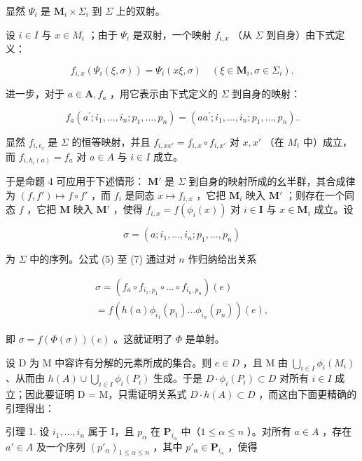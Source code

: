 显然 \(\Psi_{i}\) 是 \(\mathbf{M}_i\times \Sigma_i\) 到 \(\Sigma\) 上的双射。

设 \(i \in I\) 与 \(x \in M_i\) ；由于 \(\Psi_i\) 是双射，一个映射 \(f_{i,x}\) （从 \(\Sigma\) 到自身）由下式定义：

\[
f _ {i, x} (\Psi_ {i} (\xi , \sigma)) = \Psi_ {i} (x \xi , \sigma) \quad (\xi \in \mathbf {M} _ {i}, \sigma \in \Sigma_ {i}).\tag{6}
\]

进一步，对于 \(a \in \mathbf{A}, f_a\) ，用它表示由下式定义的 \(\Sigma\) 到自身的映射：

\[
f _ {a} (a ^ {\prime}; i _ {1}, \dots , i _ {n}; p _ {1}, \dots , p _ {n}) = (a a ^ {\prime}; i _ {1}, \dots , i _ {n}; p _ {1}, \dots , p _ {n}).\tag{7}
\]

显然 \(f_{i, e_i}\) 是 \(\Sigma\) 的恒等映射，并且 \(f_{i, xx'} = f_{i, x} \circ f_{i, x'}\) 对 \(x, x'\) （在 \(M_i\) 中）成立，而 \(f_{i, h_i(a)} = f_a\) 对 \(a \in A\) 与 \(i \in I\) 成立。

于是命题 4 可应用于下述情形： \(\mathbf{M}'\) 是 \(\Sigma\) 到自身的映射所成的幺半群，其合成律为 \((f, f') \mapsto f \circ f'\) ，而 \(f_{i}\) 是同态 \(x \mapsto f_{i,x}\) ，它把 \(\mathbf{M}_{i}\) 映入 \(\mathbf{M}'\) ；则存在一个同态 \(f\) ，它把 \(\mathbf{M}\) 映入 \(\mathbf{M}'\) ，使得 \(f_{i,x} = f(\phi_i(x))\) 对 \(i \in \mathbf{I}\) 与 \(x \in \mathbf{M}_i\) 成立。设

\[
\sigma = (a; i _ {1}, \dots , i _ {n}; p _ {1}, \dots , p _ {n})
\]

为 \(\Sigma\) 中的序列。公式 (5) 至 (7) 通过对 \(n\) 作归纳给出关系

\[
\begin{array}{l} \sigma = (f _ {a} \circ f _ {i _ {1}, p _ {1}} \circ \dots \circ f _ {i _ {n}, p _ {n}}) (e) \\ = f (h (a) \phi_ {i _ {1}} (p _ {1}) \dots \phi_ {i _ {n}} (p _ {n})) (e), \end{array}
\]

即 \(\sigma = f(\Phi(\sigma))(e)\) 。这就证明了 \(\Phi\) 是单射。


设 D 为 M 中容许有分解的元素所成的集合。则 \(e \in D\) ，且 M 由 \(\bigcup_{i \in I} \phi_i(M_i)\) 、从而由 \(h(A) \cup \bigcup_{i \in I} \phi_i(P_i)\) 生成。于是 \(D \cdot \phi_i(P_i) \subset D\) 对所有 \(i \in I\) 成立；因此要证明 D = M，只需证明关系式 \(D \cdot h(A) \subset D\) ，而这由下面更精确的引理得出：

引理 1. 设 \(i_1, \ldots, i_n\) 属于 I，且 \(p_\alpha\) 在 \(\mathbf{P}_{i_\alpha}\) 中（\(1 \leqslant \alpha \leqslant n\) ）。对所有 \(a \in A\) ，存在 \(a' \in A\) 及一个序列 \((p'_\alpha)_{1 \leqslant \alpha \leqslant n}\) ，其中 \(p'_\alpha \in \mathbf{P}_{i_\alpha}\) ，使得

